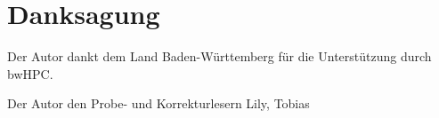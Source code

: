 \chapter*{Danksagung}


Der Autor dankt dem Land Baden-Württemberg für die Unterstützung durch bwHPC.

Der Autor den Probe- und Korrekturlesern Lily, Tobias